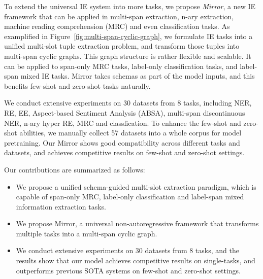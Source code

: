 To extend the universal IE system into more tasks, we propose \textit{Mirror}, a new IE framework that can be applied in multi-span extraction, n-ary extraction, machine reading comprehension (MRC) and even classification tasks.
As examplified in Figure~\ref{fig:multi-span-cyclic-graph}, we formulate IE tasks into a unified multi-slot tuple extraction problem, and transform those tuples into multi-span cyclic graphs.
This graph structure is rather flexible and scalable.
It can be applied to span-only MRC tasks, label-only classification tasks, and label-span mixed IE tasks.
Mirror takes schemas as part of the model inputs, and this benefits few-shot and zero-shot tasks naturally.

We conduct extensive experiments on 30 datasets from 8 tasks, including NER, RE, EE, Aspect-based Sentiment Analysis (ABSA), multi-span discontinuous NER, n-ary hyper RE, MRC and classfication.
To enhance the few-shot and zero-shot abilities, we manually collect 57 datasets into a whole corpus for model pretraining.
Our Mirror shows good compatibility across different tasks and datasets, and achieves competitive results on few-shot and zero-shot settings.

Our contributions are summarized as follows:
\begin{itemize}
    \item We propose a unified schema-guided multi-slot extraction paradigm, which is capable of span-only MRC, label-only classification and label-span mixed information extraction tasks.
    \item We propose Mirror, a universal non-autoregressive framework that transforms multiple tasks into a multi-span cyclic graph.
    \item We conduct extensive experiments on 30 datasets from 8 tasks, and the results show that our model achieves competitive results on single-tasks, and outperforms previous SOTA systems on few-shot and zero-shot settings.
\end{itemize}
